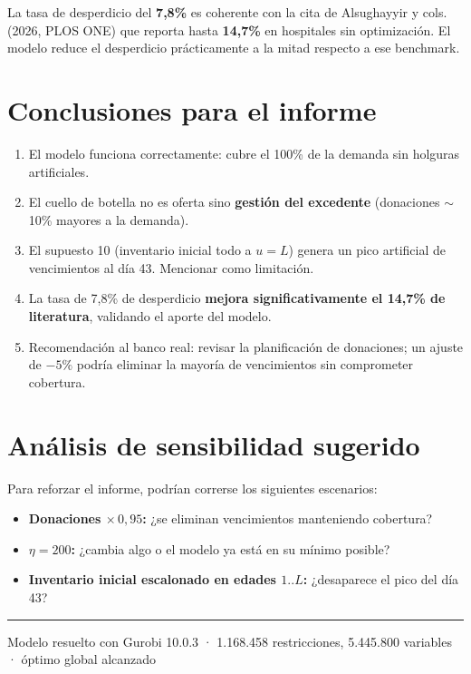\documentclass[11pt, a4paper]{article}
\begin{document}
La tasa de desperdicio del \textbf{7,8\%} es coherente con la cita de Alsughayyir y cols. (2026, PLOS ONE) que reporta hasta \textbf{14,7\%} en hospitales sin optimización. El modelo reduce el desperdicio prácticamente a la mitad respecto a ese benchmark.

\section{Conclusiones para el informe}

\begin{enumerate}[leftmargin=*, itemsep=3pt]
  \item El modelo funciona correctamente: cubre el 100\% de la demanda sin holguras artificiales.
  \item El cuello de botella no es oferta sino \textbf{gestión del excedente} (donaciones $\sim$10\% mayores a la demanda).
  \item El supuesto 10 (inventario inicial todo a $u=L$) genera un pico artificial de vencimientos al día 43. Mencionar como limitación.
  \item La tasa de 7,8\% de desperdicio \textbf{mejora significativamente el 14,7\% de literatura}, validando el aporte del modelo.
  \item Recomendación al banco real: revisar la planificación de donaciones; un ajuste de $-5\%$ podría eliminar la mayoría de vencimientos sin comprometer cobertura.
\end{enumerate}

\section{Análisis de sensibilidad sugerido}

Para reforzar el informe, podrían correrse los siguientes escenarios:

\begin{itemize}[leftmargin=*, itemsep=2pt]
  \item \textbf{Donaciones $\times\,0{,}95$:} ¿se eliminan vencimientos manteniendo cobertura?
  \item \textbf{$\eta = 200$:} ¿cambia algo o el modelo ya está en su mínimo posible?
  \item \textbf{Inventario inicial escalonado en edades $1..L$:} ¿desaparece el pico del día 43?
\end{itemize}

\vfill
{\color{ucblue}\rule{\linewidth}{0.6pt}}
\begin{center}
  \small Modelo resuelto con Gurobi 10.0.3 · 1.168.458 restricciones, 5.445.800 variables · óptimo global alcanzado
\end{center}
\end{document}
